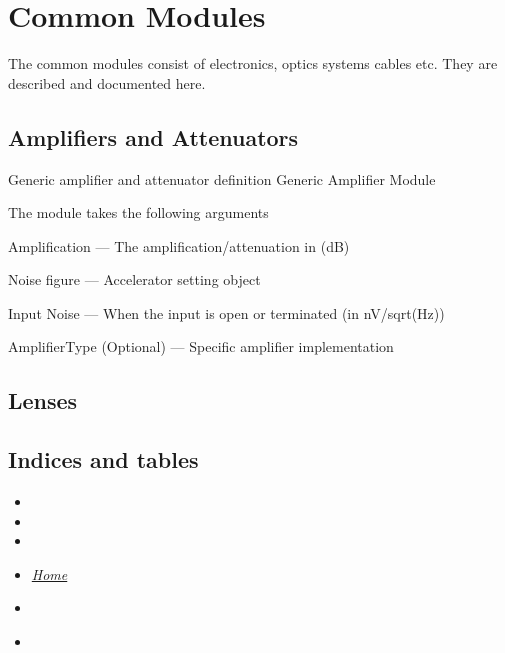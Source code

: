 \documentclass[letterpaper,10pt,english]{sphinxmanual}
\begin{document}
\section{Common Modules}
\label{common_modules::doc}\label{common_modules:common-modules}
The common modules consist of electronics, optics systems cables etc. They are described and documented here.


\subsection{Amplifiers and Attenuators}
\label{common_modules:amplifiers-and-attenuators}
Generic amplifier and attenuator definition
\label{common_modules:module-AmpAttModule}
Generic Amplifier Module

The module takes the following arguments

Amplification --- The amplification/attenuation in (dB)

Noise figure --- Accelerator setting object

Input Noise --- When the input is open or terminated (in nV/sqrt(Hz))

AmplifierType (Optional) --- Specific amplifier implementation


\subsection{Lenses}
\label{common_modules:lenses}

\subsection{Indices and tables}
\label{common_modules:indices-and-tables}\begin{itemize}
\item {} 

\item {} 

\item {} 

\item {} 
{\hyperref[index::doc]{\emph{\emph{Home}}}}

\item {} 
{\hyperref[index:index-label]{\emph{}}}

\item {} 
{\hyperref[beam:beam-label]{\emph{}}}

\end{itemize}
\end{document}
